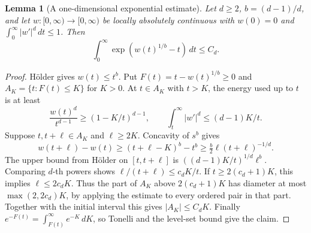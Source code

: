 \documentclass[11pt,oneside,openany]{book}
\newtheorem{lemma}[theorem]{Lemma}
\theoremstyle{definition}
\theoremstyle{remark}
\begin{document}
\begin{lemma}[A one-dimensional exponential estimate]
\label{p102:u5-moser-1d}
Let \(d\ge2\), \(b=(d-1)/d\), and let \(w:[0,\infty)\to[0,\infty)\)
be locally absolutely continuous with \(w(0)=0\) and
\(\int_0^\infty |w'|^d\,dt\le1\). Then
\[
 \int_0^\infty \exp\!\left(w(t)^{1/b}-t\right)\,dt\le C_d .
\]
\end{lemma}
\begin{proof}
H\"older gives \(w(t)\le t^b\). Put \(F(t)=t-w(t)^{1/b}\ge0\)
and \(A_K=\{t:F(t)\le K\}\) for \(K>0\).
At \(t\in A_K\) with \(t>K\), the energy used up to \(t\) is at least
\[
 \frac{w(t)^d}{t^{d-1}}\ge (1-K/t)^{d-1},
 \qquad
 \int_t^\infty |w'|^d\le (d-1)K/t.
\]
Suppose \(t,t+\ell\in A_K\) and \(\ell\ge2K\). Concavity of
\(s^b\) gives
\[
 w(t+\ell)-w(t)\ge (t+\ell-K)^b-t^b
 \ge \tfrac b2\ell(t+\ell)^{-1/d}.
\]
The upper bound from H\"older on \([t,t+\ell]\) is
\(((d-1)K/t)^{1/d}\ell^b\). Comparing \(d\)-th powers shows
\(\ell/(t+\ell)\le c_dK/t\). If \(t\ge2(c_d+1)K\), this implies
\(\ell\le2c_dK\). Thus the part of \(A_K\) above
\(2(c_d+1)K\) has diameter at most \(\max(2,2c_d)K\),
by applying the estimate to every ordered pair in that part.
Together with the initial interval this gives \(|A_K|\le C_dK\).
Finally \(e^{-F(t)}=\int_{F(t)}^\infty e^{-K}\,dK\), so Tonelli
and the level-set bound give the claim.
\end{proof}
\end{document}
